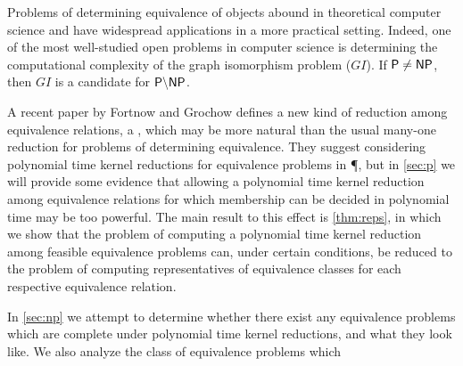 Problems of determining equivalence of objects abound in theoretical computer
science and have widespread applications in a more practical setting. Indeed,
one of the most well-studied open problems in computer science is determining
the computational complexity of the graph isomorphism problem ($GI$). If
${\mathsf{P}}\neq{\ensuremath{\mathsf{NP}}}$, then $GI$ is a candidate for ${\mathsf{P}}\backslash{\ensuremath{\mathsf{NP}}}$.

A recent paper by Fortnow and Grochow \cite{fg09} defines a new kind of
reduction among equivalence relations, a , which may be
more natural than the usual many-one reduction for problems of determining
equivalence. They suggest considering polynomial time kernel reductions for
equivalence problems in \P, but in \autoref{sec:p} we will provide some
evidence that allowing a polynomial time kernel reduction among equivalence
relations for which membership can be decided in polynomial time may be too
powerful. The main result to this effect is \autoref{thm:reps}, in which we
show that the problem of computing a polynomial time kernel reduction among
feasible equivalence problems can, under certain conditions, be reduced to the
problem of computing representatives of equivalence classes for each respective
equivalence relation.

In \autoref{sec:np} we attempt to determine whether there exist any equivalence
problems which are complete under polynomial time kernel reductions, and what
they look like. We also analyze the class of equivalence problems which 
